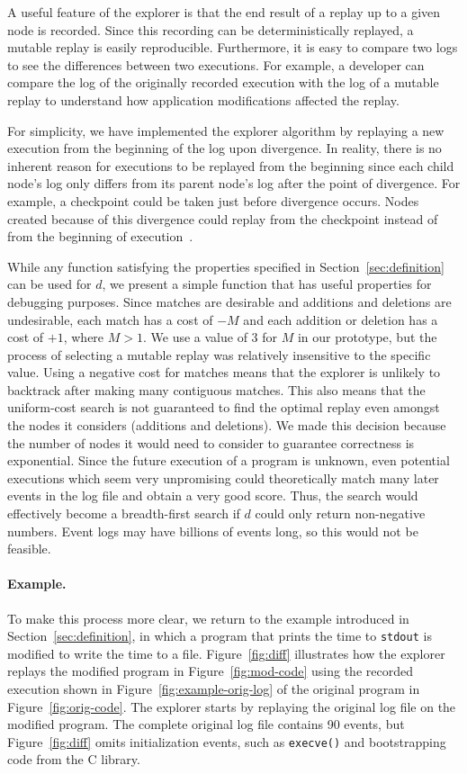 A useful feature of the explorer is that the end result of a
replay up to a given node is recorded. Since this recording can be
deterministically replayed, a mutable replay is easily reproducible.
Furthermore, it is easy to compare two logs to see the differences
between two executions.  For example, a
developer can compare the log of the originally recorded execution with the log of
a mutable replay to understand how application modifications affected the
replay.

For simplicity, we have implemented the explorer algorithm by
replaying a new execution from the beginning of the log upon divergence.
In reality, there is no inherent reason for executions to be replayed from the
beginning since each child node's log only differs from its parent node's log
after the point of divergence. For example, a checkpoint could be taken just
before divergence occurs. Nodes created because of this divergence could
replay from the checkpoint instead of from the beginning of
execution~\cite{dejaview,zap07,zap02}.

While any function satisfying the properties specified in
Section~\ref{sec:definition} can be used for $d$, we present a simple
function that has useful properties for debugging purposes.
Since matches are desirable and additions and deletions are undesirable,
each match has a cost of $-M$ and each addition or deletion has a cost of
$+1$, where $M > 1$. We use a value of $3$ for $M$ in our prototype,
but the process of selecting a mutable replay was relatively
insensitive to the specific value.
Using a negative cost for matches
means that the explorer is unlikely to backtrack after making many
contiguous matches.  This also means that the uniform-cost search
is not guaranteed to find the optimal replay even amongst the nodes it
considers (additions and deletions).  We made this decision because
the number of nodes it would need to consider to guarantee correctness
is exponential. Since the future execution of a program is 
unknown, even potential executions which seem very unpromising could
theoretically match many later events in the log file and obtain a very good
score. Thus, the search would effectively become a breadth-first search if $d$
could only return non-negative numbers.  Event logs may have billions of
events long, so this would not be feasible.

\paragraph{Example.}
To make this process more clear, we return to the example introduced in
Section~\ref{sec:definition}, in which a program that prints the time to
{\tt stdout} is modified to write the time to a file.
Figure~\ref{fig:diff} illustrates how the explorer replays the
modified program in Figure~\ref{fig:mod-code} using the recorded execution
shown in Figure~\ref{fig:example-orig-log} of the original program in 
Figure~\ref{fig:orig-code}. The explorer starts by replaying the
original log file on the modified program. The complete original log file
contains 90 events, but Figure~\ref{fig:diff} omits initialization
events, such as {\tt execve()} and bootstrapping code from the C library. 

